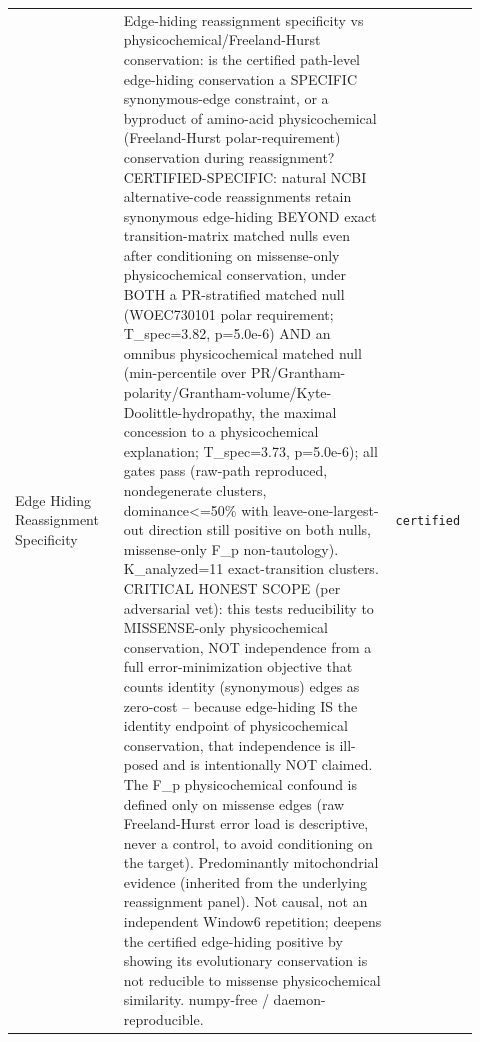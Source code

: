 \begin{longtable}{>{\raggedright\arraybackslash}p{0.22\linewidth}>{\raggedright\arraybackslash}p{0.55\linewidth}>{\raggedright\arraybackslash}p{0.15\linewidth}}
Edge Hiding Reassignment Specificity & Edge-hiding reassignment specificity vs physicochemical/Freeland-Hurst conservation: is the certified path-level edge-hiding conservation a SPECIFIC synonymous-edge constraint, or a byproduct of amino-acid physicochemical (Freeland-Hurst polar-requirement) conservation during reassignment? CERTIFIED-SPECIFIC: natural NCBI alternative-code reassignments retain synonymous edge-hiding BEYOND exact transition-matrix matched nulls even after conditioning on missense-only physicochemical conservation, under BOTH a PR-stratified matched null (WOEC730101 polar requirement; T\_spec=3.82, p=5.0e-6) AND an omnibus physicochemical matched null (min-percentile over PR/Grantham-polarity/Grantham-volume/Kyte-Doolittle-hydropathy, the maximal concession to a physicochemical explanation; T\_spec=3.73, p=5.0e-6); all gates pass (raw-path reproduced, nondegenerate clusters, dominance<=50\% with leave-one-largest-out direction still positive on both nulls, missense-only F\_p non-tautology). K\_analyzed=11 exact-transition clusters. CRITICAL HONEST SCOPE (per adversarial vet): this tests reducibility to MISSENSE-only physicochemical conservation, NOT independence from a full error-minimization objective that counts identity (synonymous) edges as zero-cost -- because edge-hiding IS the identity endpoint of physicochemical conservation, that independence is ill-posed and is intentionally NOT claimed. The F\_p physicochemical confound is defined only on missense edges (raw Freeland-Hurst error load is descriptive, never a control, to avoid conditioning on the target). Predominantly mitochondrial evidence (inherited from the underlying reassignment panel). Not causal, not an independent Window6 repetition; deepens the certified edge-hiding positive by showing its evolutionary conservation is not reducible to missense physicochemical similarity. numpy-free / daemon-reproducible. & \texttt{certified} \\

\end{longtable}
